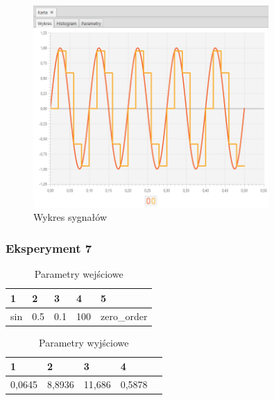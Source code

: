 \documentclass[12pt]{article}
\begin{document}
{{{                \begin{figure}[H]
                    \centering
                    \includegraphics[width=0.8\textwidth]{img/result/experiment1/06/data_draw_original_chart_recon_output_130225.png}
                    \caption{Wykres sygnałów}
                \end{figure}
            }
            \newpage

            \subsubsection{Eksperyment 7} {
                \begin{table}[H]
                    \centering
                    \begin{tabular}{|l|l|l|l|l|}
                        \hline
                        1 & 2 & 3 & 4 & 5   \\ \hline
                        sin & 0.5 & 0.1 & 100 & zero\_order   \\ \hline
                    \end{tabular}
                    \caption{Parametry wejściowe}
                \end{table}

                \begin{table}[H]
                    \centering
                    \begin{tabular}{|l|l|l|l|l|}
                        \hline
                        1 & 2 & 3 & 4   \\ \hline
                        0,0645 & 8,8936 & 11,686 & 0,5878   \\ \hline
                    \end{tabular}
                    \caption{Parametry wyjściowe}
                \end{table}


}}}
\end{document}
